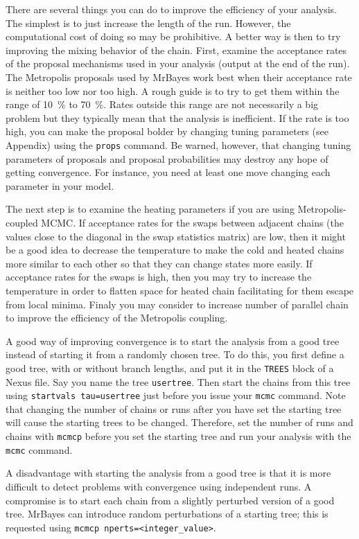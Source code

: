 \documentclass[12pt]{book}
\begin{document}
There are several things you can do to improve the efficiency of your analysis. The simplest is to
just increase the length of the run. However, the computational cost of doing so may be
prohibitive. A better way is then to try improving the mixing behavior of the chain. First, examine
the acceptance rates of the proposal mechanisms used in your analysis (output at the end of the
run). The Metropolis proposals used by MrBayes work best when their acceptance rate is neither too
low nor too high. A rough guide is to try to get them within the range of 10~\% to 70~\%. Rates
outside this range are not necessarily a big problem but they typically mean that the analysis is
inefficient. If the rate is too high, you can make the proposal bolder by changing tuning
parameters (see Appendix) using the \texttt{props} command. Be warned, however, that changing
tuning parameters of proposals and proposal probabilities may destroy any hope of getting
convergence. For instance, you need at least one move changing each parameter in your model.

The next step is to examine the heating parameters if you are using Metropolis-coupled MCMC. If
acceptance rates for the swaps between adjacent chains (the values close to the diagonal in the
swap statistics matrix) are low, then it might be a good idea to decrease the temperature to make
the cold and heated chains more similar to each other so that they can change states more easily.
If acceptance rates for the swaps is high, then you may try to increase the temperature in order to
flatten space for heated chain facilitating for them escape from local minima. Finaly you may
consider to increase number of parallel chain to improve the efficiency of the Metropolis coupling.

A good way of improving convergence is to start the analysis from a good tree instead of starting
it from a randomly chosen tree. To do this, you first define a good tree, with or without branch
lengths, and put it in the \texttt{TREES} block of a Nexus file. Say you name the tree
\texttt{usertree}.  Then start the chains from this tree using \texttt{startvals tau=usertree} just
before you issue your \texttt{mcmc} command. Note that changing the number of chains or runs after
you have set the starting tree will cause the starting trees to be changed. Therefore, set the
number of runs and chains with \texttt{mcmcp} before you set the starting tree and run your
analysis with the \texttt{mcmc} command.

A disadvantage with starting the analysis from a good tree is that it is more difficult to detect
problems with convergence using independent runs. A compromise is to start each chain from a
slightly perturbed version of a good tree. MrBayes can introduce random perturbations of a starting
tree; this is requested using \texttt{mcmcp nperts=<integer\_value>}.
\end{document}
